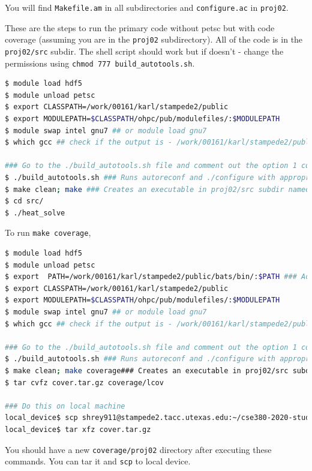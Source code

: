 \documentclass[12 pt, final]{article}
\begin{document}
\begin{itemize}
\begin{itemize}
        You will find \texttt{Makefile.am} in all subdirectories and \texttt{configure.ac} in \texttt{proj02}.
        
        These are the steps to run the primary code without petsc but with code coverage (assuming you are in the \texttt{proj02} subdirectory). All of the code is in the \texttt{proj02/src} subdir. The shell script should work but if doesn't - change the permissions using \texttt{chmod 777 build\_autotools.sh}.
        \begin{lstlisting}[language = bash]
$ module load hdf5
$ module unload petsc
$ export CLASSPATH=/work/00161/karl/stampede2/public
$ export MODULEPATH=$CLASSPATH/ohpc/pub/modulefiles/:$MODULEPATH
$ module swap intel gnu7 ## or module load gnu7
$ which gcc ## check if the output is - /work/00161/karl/stampede2/public/ohpc/pub/compiler/gcc/7.1.0/bin/gcc

### Go to the ./build_autotools.sh file and comment out the option 1 configure line and uncomment the option 2 configure line.
$ ./build_autotools.sh ### Runs autoreconf and ./configure with appropriate options to link to MASA and GRVY
$ make clean; make ### Creates an executable in proj02/src subdir named heat_solve
$ cd src/
$ ./heat_solve
        \end{lstlisting}
        
To run \texttt{make coverage}, 
       \begin{lstlisting}[language = bash]
$ module load hdf5
$ module unload petsc
$ export  PATH=/work/00161/karl/stampede2/public/bats/bin/:$PATH ### Add bats to path to run regression tests
$ export CLASSPATH=/work/00161/karl/stampede2/public
$ export MODULEPATH=$CLASSPATH/ohpc/pub/modulefiles/:$MODULEPATH
$ module swap intel gnu7 ## or module load gnu7
$ which gcc ## check if the output is - /work/00161/karl/stampede2/public/ohpc/pub/compiler/gcc/7.1.0/bin/gcc

### Go to the ./build_autotools.sh file and comment out the option 1 configure line and uncomment the option 2 configure line.
$ ./build_autotools.sh ### Runs autoreconf and ./configure with appropriate options to link to MASA and GRVY
$ make clean; make coverage### Creates an executable in proj02/src subdir named heat_solve
$ tar cvfz cover.tar.gz coverage/lcov

### Do this on local machine
local_device$ scp shrey911@stampede2.tacc.utexas.edu:~/cse380-2020-student-Shreyas911/proj02/cover.tar.gz ~/Desktop
local_device$ tar xfz cover.tar.gz
        \end{lstlisting}
You should have a new \texttt{coverage/proj02} directory after executing these commands. You can tar it and \texttt{scp} to local device.


\end{itemize}
\end{itemize}
\end{document}
